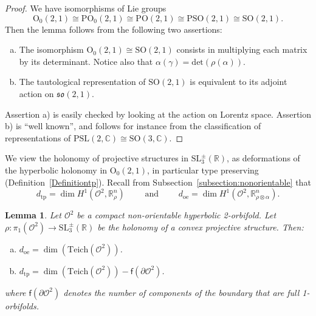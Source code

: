 \documentclass[a4paper,11pt]{article}
\newtheorem{Lemma}[Theorem]{Lemma}
\begin{document}
 
 \begin{proof}
 We have isomorphisms of Lie groups
 $$
 \mathrm{O}_0(2,1)  \cong \mathrm{PO}_0(2,1)\cong \mathrm{PO}(2,1)\cong \mathrm{PSO}(2,1)\cong \mathrm{SO}(2,1).
 $$
 Then the lemma follows from the following two assertions:
 \begin{enumerate}[a)]
  \item The isomorphism $\mathrm{O}_0(2,1) \cong  \mathrm{SO}(2,1)$ consists in multiplying each matrix  by its determinant. Notice also that
  $\alpha(\gamma)=\mathrm{det}(\rho(\alpha))$.
  \item The tautological representation of $\mathrm{SO}(2,1)$
is equivalent to its adjoint action on $\mathfrak{so}(2,1)$.
 \end{enumerate}
Assertion a) is easily checked by looking at the action on Lorentz space. Assertion b) is ``well known'', and follows for instance
from the classification of representations of
$\mathrm{PSL}(2,\mathbb{C})\cong \mathrm{SO}(3,\mathbb{C})$.
% 
% 
 \end{proof}

 
 
 We view the holonomy of projective structures in
 $\mathrm{SL}^{\pm}_3(\mathbb R)$, as deformations
 of the hyperbolic holonomy in $\mathrm{O}_0(2,1)$,
 in particular type preserving 
 (Definition~\ref{Definitiontp}). Recall from Subsection~\ref{subsection:nonorientable} 
 that
 $$d_{\mathrm{tp}}=\dim H^1(\mathcal O ^2,\mathbb R^n_\rho)\qquad\textrm{ and }\qquad
 d_{\mathrm{oe}}=\dim H^1(\mathcal O ^2,\mathbb R^n_{\rho\otimes \alpha}).
 $$

 
 \begin{Lemma} 
 \label{lemma:dims}
  Let $\mathcal O^2$ be a compact non-orientable hyperbolic 2-orbifold. Let $\rho\colon \pi_1(\mathcal O^2)\to \mathrm{SL}^{\pm}_3(\mathbb R)$
  be the holonomy of a convex projective structure. 
 Then:
 \begin{enumerate}[(a)]
  \item $d_{\mathrm{oe}}=\dim( \mathrm{Teich}(\mathcal O^2)) $.
  \item $d_{\mathrm{tp}}= \dim (\mathrm{Teich}(\mathcal O^2))-\mathsf{f}(\partial \mathcal O^2)  $.
 \end{enumerate}
where $\mathsf{f}(\partial \mathcal O^2)  $ denotes the number of 
components of the boundary that are full 1-orbifolds.
\end{Lemma}
\end{document}
